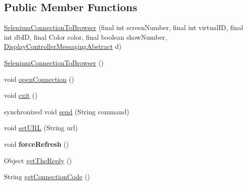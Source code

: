 \subsection*{Public Member Functions}
\begin{DoxyCompactItemize}
\item 
\hyperlink{classgov_1_1fnal_1_1ppd_1_1dd_1_1display_1_1client_1_1selenium_1_1SeleniumConnectionToBrowser_abc7adbb4c853afb84ed97538afe63483}{Selenium\-Connection\-To\-Browser} (final int screen\-Number, final int virtual\-I\-D, final int db\-I\-D, final Color color, final boolean show\-Number, \hyperlink{classgov_1_1fnal_1_1ppd_1_1dd_1_1display_1_1client_1_1DisplayControllerMessagingAbstract}{Display\-Controller\-Messaging\-Abstract} d)
\item 
\hyperlink{classgov_1_1fnal_1_1ppd_1_1dd_1_1display_1_1client_1_1selenium_1_1SeleniumConnectionToBrowser_a60849cac75b4a49f0ee042fdd49fce7d}{Selenium\-Connection\-To\-Browser} ()
\item 
void \hyperlink{classgov_1_1fnal_1_1ppd_1_1dd_1_1display_1_1client_1_1selenium_1_1SeleniumConnectionToBrowser_ad8d8990b0efc906bcf484f929fb52dea}{open\-Connection} ()
\item 
void \hyperlink{classgov_1_1fnal_1_1ppd_1_1dd_1_1display_1_1client_1_1selenium_1_1SeleniumConnectionToBrowser_ac289ed7c08bcf22fe88cbd1e49a9ce6a}{exit} ()
\item 
synchronized void \hyperlink{classgov_1_1fnal_1_1ppd_1_1dd_1_1display_1_1client_1_1selenium_1_1SeleniumConnectionToBrowser_a120575551e9b61673195a011d131ef51}{send} (String command)
\item 
void \hyperlink{classgov_1_1fnal_1_1ppd_1_1dd_1_1display_1_1client_1_1selenium_1_1SeleniumConnectionToBrowser_a0efbaa6634b0b6ed135d1a66b2d19bae}{set\-U\-R\-L} (String url)
\item 
\hypertarget{classgov_1_1fnal_1_1ppd_1_1dd_1_1display_1_1client_1_1selenium_1_1SeleniumConnectionToBrowser_a7798d1132c4890b4918766200f69c325}{void {\bfseries force\-Refresh} ()}\label{classgov_1_1fnal_1_1ppd_1_1dd_1_1display_1_1client_1_1selenium_1_1SeleniumConnectionToBrowser_a7798d1132c4890b4918766200f69c325}

\item 
Object \hyperlink{classgov_1_1fnal_1_1ppd_1_1dd_1_1display_1_1client_1_1selenium_1_1SeleniumConnectionToBrowser_aa84016c2869e64d30921b02a1262f997}{get\-The\-Reply} ()
\item 
String \hyperlink{classgov_1_1fnal_1_1ppd_1_1dd_1_1display_1_1client_1_1selenium_1_1SeleniumConnectionToBrowser_a9afb54c8a29bfc01a8a20d3675770389}{get\-Connection\-Code} ()
\end{DoxyCompactItemize}
